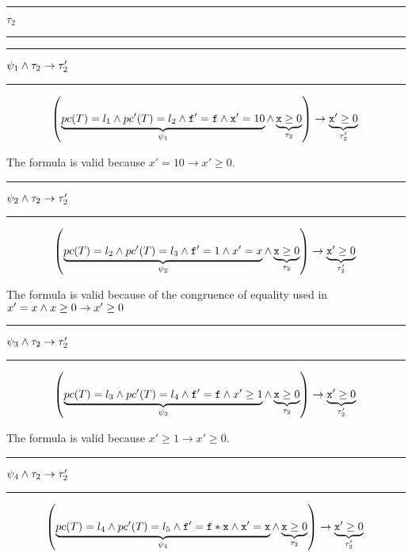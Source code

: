 \begin{center}\rule{4cm}{0.4pt}  $\tau_2$  \rule{4cm}{0.4pt}\end{center}

	\rule{1cm}{0.2pt}\; $\psi_1 \wedge \tau_2 \to \tau_2'$ \;\rule{1cm}{0.2pt}
	

	\begin{dmath*}[indentstep={5em}]
		\left(
			\underbrace{\pc(T) = l_1 \andcond \pc'(T) = l_2 \andcond \mathtt{f'=f} \andcond \mathtt{x}' = 10}_{\psi_1} \andcond \underbrace{\mathtt{x} \geq 0}_{\tau_2}
		\right) 
				\to  \underbrace{\mathtt{x}' \geq 0}_{\tau_2'}\\\\
	\end{dmath*}

	The formula is valid because $x'=10 \to x'\geq 0$.

	\rule{1cm}{0.2pt}\; $\psi_2 \wedge \tau_2 \to \tau_2'$ \;\rule{1cm}{0.2pt}
	

	\begin{dmath*}[indentstep={5em}]
		\left(
			\underbrace{\pc(T) = l_2 \andcond \pc'(T) = l_3 \andcond \mathtt{f}' = 1 \andcond x'=x}_{\psi_2} \andcond \underbrace{\mathtt{x} \geq 0}_{\tau_2}
		\right) 
			\to \underbrace{\mathtt{x}' \geq 0}_{\tau_2'}\\\\
	\end{dmath*}


	The formula is valid because of the congruence of equality used in  $x'=x \wedge x\geq 0 \to x'\geq 0$ 

	\rule{1cm}{0.2pt}\; $\psi_3 \wedge \tau_2 \to \tau_2'$ \;\rule{1cm}{0.2pt}
	

	\begin{dmath*}[indentstep={5em}]
		\left(
			\underbrace{\pc(T) = l_3 \andcond \pc'(T) = l_4 \andcond \mathtt{f'=f} \andcond x'\geq 1}_{\psi_3} \andcond \underbrace{\mathtt{x} \geq 0}_{\tau_2}
		\right) 
			\to \underbrace{\mathtt{x}' \geq 0}_{\tau_2'}\\\\
	\end{dmath*}

	The formula is valid because $x'\geq 1 \to x'\geq 0$.

	\rule{1cm}{0.2pt}\; $\psi_4 \wedge \tau_2 \to \tau_2'$ \;\rule{1cm}{0.2pt}
	

	\begin{dmath*}[indentstep={5em}]
		\left(
			\underbrace{\pc(T) = l_4 \andcond \pc'(T) = l_5 \andcond \mathtt{f}' = \mathtt{f*x} \andcond \mathtt{x'=x}}_{\psi_4} \andcond \underbrace{\mathtt{x} \geq 0}_{\tau_2}
		\right) 
			\to \underbrace{\mathtt{x}' \geq 0}_{\tau_2'}\\\\
	\end{dmath*}

